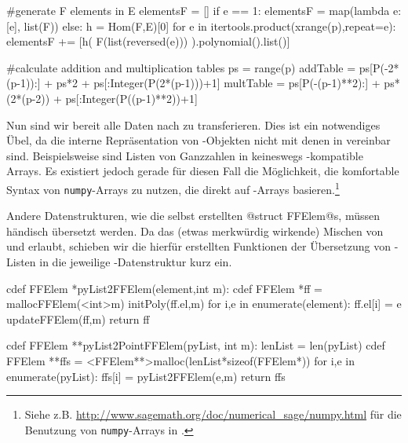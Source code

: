 \begin{sagecode}[caption={\texttt{countCompleteSubmoduleGenerators}
  Fortsetzung (II)}, 
  firstnumber=183]
        #generate F elements in E
    elementsF = []
    if e == 1:
        elementsF = map(lambda e: [e], list(F))
    else:
        h = Hom(F,E)[0]
        for e in itertools.product(xrange(p),repeat=e):
            elementsF += [h( F(list(reversed(e))) ).polynomial().list()]

        #calculate addition and multiplication tables
    ps = range(p)
    addTable = ps[P(-2*(p-1)):] + ps*2 + ps[:Integer(P(2*(p-1)))+1]
    multTable = ps[P(-(p-1)**2):] + ps*(2*(p-2)) + ps[:Integer(P((p-1)**2))+1]
\end{sagecode}  


Nun sind wir bereit alle Daten nach \Clang zu transferieren. Dies ist ein
notwendiges Übel, da die interne Repräsentation von \sage-Objekten nicht mit
denen in \Clang vereinbar sind. Beispielsweise sind Listen von Ganzzahlen
in \sage keineswegs \Clang-kompatible Arrays. 
Es existiert jedoch gerade für diesen Fall die Möglichkeit,
die komfortable Syntax von \texttt{numpy}-Arrays zu nutzen, die direkt auf 
\Clang-Arrays basieren.\footnote{Siehe z.B.
\url{http://www.sagemath.org/doc/numerical_sage/numpy.html} für die Benutzung
von \texttt{numpy}-Arrays in \sage.}

Andere Datenstrukturen, wie die selbst erstellten @struct FFElem@s, müssen
händisch übersetzt werden. Da \cython das (etwas merkwürdig wirkende) Mischen
von \python und \Clang erlaubt, schieben wir die hierfür erstellten Funktionen
der Übersetzung von \python-Listen in die jeweilige \Clang-Datenstruktur kurz
ein.

\begin{sagecode}[caption={Aus \url{../Sage/enumeratePCNs.spyx}},
  firstnumber=55]
cdef FFElem *pyList2FFElem(element,int m):
    cdef FFElem *ff = mallocFFElem(<int>m)
    initPoly(ff.el,m)
    for i,e in enumerate(element):
        ff.el[i] = e
    updateFFElem(ff,m)
    return ff
\end{sagecode}  

\begin{sagecode}[caption={Aus \url{../Sage/enumeratePCNs.spyx}},
  firstnumber=63]
cdef FFElem **pyList2PointFFElem(pyList, int m):
    lenList = len(pyList)
    cdef FFElem **ffs = <FFElem**>malloc(lenList*sizeof(FFElem*))
    for i,e in enumerate(pyList):
        ffs[i] = pyList2FFElem(e,m)
    return ffs
\end{sagecode}

